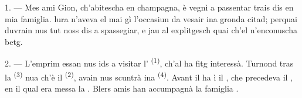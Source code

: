 %
%
%
%
%
%

\VUsaut{4.0mm}
\VUsaut{3.0mm}

\VUsaut{3.0mm}

1. --- Mes ami Gion, ch'abitescha en champagna, è vegnì a passentar trais dis en mia
famiglia.  lura n'aveva el mai gì l'occasiun da vesair ina gronda citad;
perquai duvrain nus tut noss dis a spassegiar, e jau al explitgesch quai ch'el
n'enconuscha betg.

2. --- L'emprim essan nus ids a visitar l' \textsuperscript{(1)}, ch'al
ha fitg interessà. Turnond tras la  \textsuperscript{(3)} nua ch'è il  \textsuperscript{(2)}, avain nus scuntrà ina  \textsuperscript{(4)}. Avant
il  ha ì il , che precedeva il , en il qual era messa la . Blers amis han accumpagnà la famiglia
.

